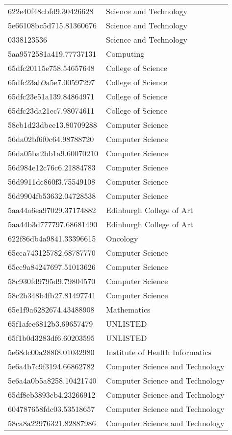 \begin{tabular}{ll}
622e40f48cbfd9.30426628 & Science and Technology \\
5e66108bc5d715.81360676 & Science and Technology \\
0338123536 & Science and Technology \\
5aa9572581a419.77737131 & Computing \\
65dfc20115e758.54657648 & College of Science \\
65dfc23ab9a5e7.00597297 & College of Science \\
65dfc23e51a139.84864971 & College of Science \\
65dfc23da21ec7.98074611 & College of Science \\
58cb1d23dbee13.80709288 & Computer Science \\
56da02bf6f0c64.98788720 & Computer Science \\
56da05ba2bb1a9.60070210 & Computer Science \\
56d984e12c76c6.21884783 & Computer Science \\
56d9911dc860f3.75549108 & Computer Science \\
56d9904fb53632.04728538 & Computer Science \\
5aa44a6ea97029.37174882 & Edinburgh College of Art \\
5aa44b3d777797.68681490 & Edinburgh College of Art \\
622f86db4a9841.33396615 & Oncology \\
65cca743125782.68787770 & Computer Science \\
65cc9a84247697.51013626 & Computer Science \\
58c930fd9795d9.79804570 & Computer Science \\
58c2b348b4fb27.81497741 & Computer Science \\
65e1f9a6282674.43488908 & Mathematics \\
65f1afee6812b3.69657479 & UNLISTED \\
65f1b0d3283df6.60203595 & UNLISTED \\
5e68dc00a288f8.01032980 & Institute of Health Informatics \\
5e6a4b7c9f3194.66862782 & Computer Science and Technology \\
5e6a4a0b5a8258.10421740 & Computer Science and Technology \\
65df8eb3893cb4.23266912 & Computer Science and Technology \\
604787658fdc03.53518657 & Computer Science and Technology \\
58ca8a22976321.82887986 & Computer Science and Technology \\

\end{tabular}

